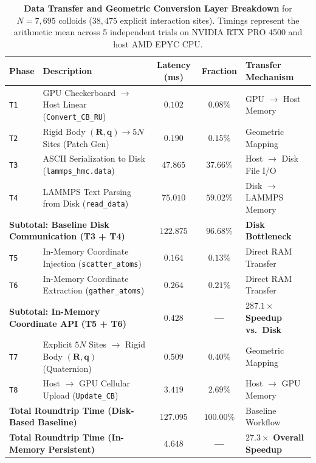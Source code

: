\documentclass[11pt,a4paper]{article}
\begin{document}
\begin{table}[t]
\centering
\small
\caption{\textbf{Data Transfer and Geometric Conversion Layer Breakdown} for $N = 7{,}695$ colloids ($38{,}475$ explicit interaction sites). Timings represent the arithmetic mean across 5 independent trials on NVIDIA RTX PRO 4500 and host AMD EPYC CPU.}
\label{tab:transfer_breakdown}
\setlength{\tabcolsep}{4.5pt}
\begin{tabularx}{\textwidth}{l>{\raggedright\arraybackslash}Xcc>{\raggedright\arraybackslash}p{3.2cm}}
\toprule
\textbf{Phase} & \textbf{Description} & \textbf{Latency (ms)} & \textbf{Fraction} & \textbf{Transfer Mechanism} \\
\midrule
\texttt{T1} & GPU Checkerboard $\to$ Host Linear (\texttt{Convert\_CB\_RU}) & $0.102$ & $0.08\%$ & GPU $\to$ Host Memory \\
\texttt{T2} & Rigid Body $(\mathbf{R}, \mathbf{q}) \to 5N$ Sites (Patch Gen) & $0.190$ & $0.15\%$ & Geometric Mapping \\
\texttt{T3} & ASCII Serialization to Disk (\texttt{lammps\_hmc.data}) & $47.865$ & $37.66\%$ & Host $\to$ Disk File I/O \\
\texttt{T4} & LAMMPS Text Parsing from Disk (\texttt{read\_data}) & $75.010$ & $59.02\%$ & Disk $\to$ LAMMPS Memory \\
\midrule
\multicolumn{2}{l}{\textbf{Subtotal: Baseline Disk Communication (T3 + T4)}} & $\mathbf{122.875}$ & $\mathbf{96.68\%}$ & \textbf{Disk Bottleneck} \\
\midrule
\texttt{T5} & In-Memory Coordinate Injection (\texttt{scatter\_atoms}) & $0.164$ & $0.13\%$ & Direct RAM Transfer \\
\texttt{T6} & In-Memory Coordinate Extraction (\texttt{gather\_atoms}) & $0.264$ & $0.21\%$ & Direct RAM Transfer \\
\midrule
\multicolumn{2}{l}{\textbf{Subtotal: In-Memory Coordinate API (T5 + T6)}} & $\mathbf{0.428}$ & \textbf{---} & $\mathbf{287.1\times}$ \textbf{Speedup vs.\ Disk} \\
\midrule
\texttt{T7} & Explicit $5N$ Sites $\to$ Rigid Body $(\mathbf{R}, \mathbf{q})$ (Quaternion) & $0.509$ & $0.40\%$ & Geometric Mapping \\
\texttt{T8} & Host $\to$ GPU Cellular Upload (\texttt{Update\_CB}) & $3.419$ & $2.69\%$ & Host $\to$ GPU Memory \\
\midrule
\multicolumn{2}{l}{\textbf{Total Roundtrip Time (Disk-Based Baseline)}} & $\mathbf{127.095}$ & $100.00\%$ & Baseline Workflow \\
\multicolumn{2}{l}{\textbf{Total Roundtrip Time (In-Memory Persistent)}} & $\mathbf{4.648}$ & \textbf{---} & $\mathbf{27.3\times}$ \textbf{Overall Speedup} \\
\bottomrule
\end{tabularx}
\end{table}
\end{document}
